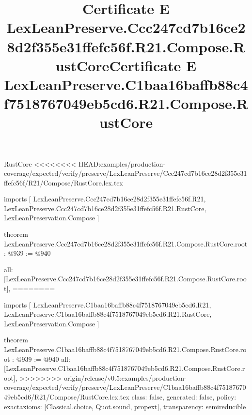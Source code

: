 \begin{lexlean}{RustCore}
<<<<<<<< HEAD:examples/production-coverage/expected/verify/preserve/LexLeanPreserve/Ccc247cd7b16ce28d2f355e31ffefc56f/R21/Compose/RustCore.lex.tex
\title{Certificate E LexLeanPreserve.Ccc247cd7b16ce28d2f355e31ffefc56f.R21.Compose.RustCore}
\begin{coremodule}
imports [
  LexLeanPreserve.Ccc247cd7b16ce28d2f355e31ffefc56f.R21,
  LexLeanPreserve.Ccc247cd7b16ce28d2f355e31ffefc56f.R21.RustCore,
  LexLeanPreservation.Compose
]

theorem LexLeanPreserve.Ccc247cd7b16ce28d2f355e31ffefc56f.R21.Compose.RustCore.root : @939 := @940 {
  all: [LexLeanPreserve.Ccc247cd7b16ce28d2f355e31ffefc56f.R21.Compose.RustCore.root],
========
\title{Certificate E LexLeanPreserve.C1baa16baffb88c4f7518767049eb5cd6.R21.Compose.RustCore}
\begin{coremodule}
imports [
  LexLeanPreserve.C1baa16baffb88c4f7518767049eb5cd6.R21,
  LexLeanPreserve.C1baa16baffb88c4f7518767049eb5cd6.R21.RustCore,
  LexLeanPreservation.Compose
]

theorem LexLeanPreserve.C1baa16baffb88c4f7518767049eb5cd6.R21.Compose.RustCore.root : @939 := @940 {
  all: [LexLeanPreserve.C1baa16baffb88c4f7518767049eb5cd6.R21.Compose.RustCore.root],
>>>>>>>> origin/release/v0.5:examples/production-coverage/expected/verify/preserve/LexLeanPreserve/C1baa16baffb88c4f7518767049eb5cd6/R21/Compose/RustCore.lex.tex
  class: false,
  generated: false,
  policy: exact{axioms: [Classical.choice, Quot.sound, propext]},
  transparency: semireducible
}


\end{coremodule}}
\end{coremodule}
\end{lexlean}
